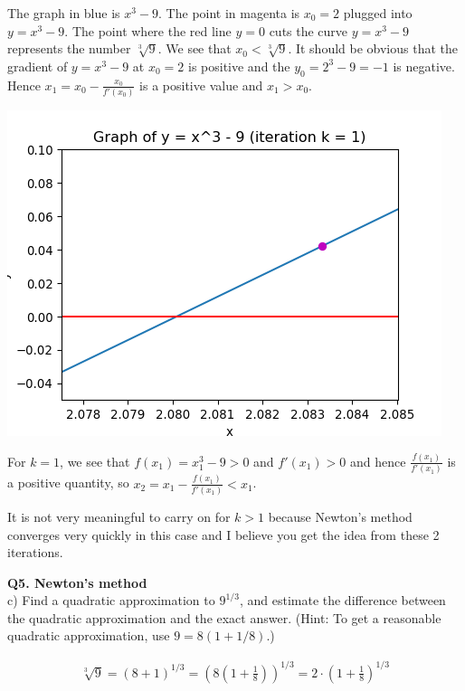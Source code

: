 \documentclass[9pt]{article}
\begin{document}
The graph in blue is $x^3 - 9$. The point in magenta is $x_0 = 2$ plugged into $y = x^3 - 9$. The point where the red line $y = 0$ cuts the curve $y = x^3 - 9$ represents the number $\sqrt[3]9$. We see that $x_0 < \sqrt[3]9$. It should be obvious that the gradient of $y = x^3 - 9$ at $x_0 = 2$ is positive and the $y_0 = 2^3 - 9 = -1$ is negative. Hence $x_1 = x_0 - \frac{x_0}{f'(x_0)}$ is a positive value and $x_1 > x_0$.

\begin{center}
  \includegraphics[scale=0.8]{k_eq_1.png}
\end{center}

For $k = 1$, we see that $f(x_1) = x_1^3 - 9 > 0$ and $f'(x_1) > 0$ and hence $\frac{f(x_1)}{f'(x_1)}$ is a positive quantity, so $x_2 = x_1 - \frac{f(x_1)}{f'(x_1)} < x_1$.

It is not very meaningful to carry on for $k > 1$ because Newton's method converges very quickly in this case and I believe you get the idea from these 2 iterations.

\begin{tcolorbox}
  \textbf{Q5. Newton's method} \\
  c) Find a quadratic approximation to $9^{1/3}$, and estimate the difference between the quadratic approximation and the exact answer. (Hint: To get a reasonable quadratic approximation, use $9 = 8(1 + 1/8)$.)
\end{tcolorbox}

\begin{align*}
  \sqrt[3]9 = (8 + 1)^{1/3} = (8(1 + \frac{1}{8}))^{1/3} = 2\cdot(1 + \frac{1}{8})^{1/3}
\end{align*}
\end{document}
